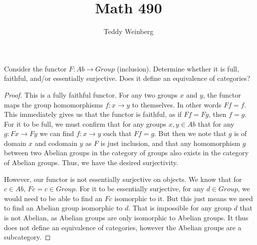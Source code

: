 \documentclass{article}
\title{Math 490}
\author{Teddy Weinberg}
\begin{document}
\maketitle
%

\begin{exercise}
	Consider the functor $F: Ab \rightarrow Group$ (inclusion).  Determine whether it is full, faithful, and/or essentially surjective.  Does it define an equivalence of categories?
\end{exercise}

\begin{proof}
	This is a fully faithful functor. For any two groups $x$ and $y$, the functor maps the group homomorphisms $f: x \rightarrow y$ to themselves.  In other words $Ff = f$.  This immediately gives us that the functor is faithful, as if $Ff = Fg$, then $f = g$.  
For it to be full, we must confirm that for any groups $x,y \in Ab$ that for any $g: Fx \rightarrow Fy$ we can find $f: x \rightarrow y$ such that $Ff = g$.  But then we note that $g$ is of domain $x$ and codomain $y$ as $F$ is just inclusion, and that any homomorphism $g$ between two Abelian groups in the category of groups
also exists in the category of Abelian groups.  Thus, we have the desired surjectivity.


However, our functor is not essentially surjective on objects.  We know that for $c \in Ab$, $Fc = c \in Group$.  For it to be essentially surjective, for any $d \in Group$, we would need to be able to find an $Fc$ isomorphic to it.  But this just means we need to find an Abelian group isomorphic to $d$.  That is impossible for any group $d$ that is not Abelian, as Abelian groups are only isomorphic to Abelian groups. It thus does not define an equivalence of categories, however the Abelian groups are a subcategory. 
\end{proof}
\end{document}

